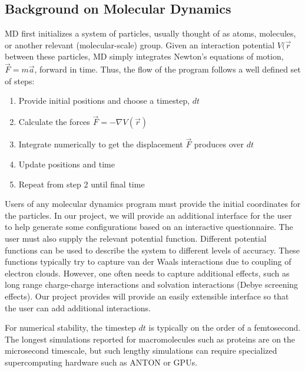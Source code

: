 \documentclass[10pt]{article}
\begin{document}
\subsection{Background on Molecular Dynamics}
MD first initializes a system of particles, usually thought of as atoms, molecules, or another relevant (molecular-scale) group.  Given an interaction potential $V (\overrightarrow{r}$ between these particles, MD simply integrates Newton's equations of motion, $\overrightarrow{F}=m\overrightarrow{a}$, forward in time.  Thus, the flow of the program follows a well defined set of steps:
\begin{enumerate}
    \item Provide initial positions and choose a timestep, $dt$
    \item Calculate the forces $\overrightarrow{F} =  -\nabla V (\overrightarrow{r}) $
    \item Integrate numerically to get the displacement $\overrightarrow{F}$ produces over $dt$
    \item Update positions and time
    \item Repeat from step 2 until final time
\end{enumerate}

Users of any molecular dynamics program must provide the initial coordinates for the particles.  In our project, we will provide an additional interface for the user to help generate some configurations based on an interactive questionnaire. The user must also supply the relevant potential function. Different potential functions can be used to describe the system to different levels of accuracy. These functions typically try to capture van der Waals interactions due to coupling of electron clouds. However, one  often needs to capture additional effects, such as long range charge-charge interactions and solvation interactions (Debye screening effects). Our project provides will provide an easily extensible interface so that the user can add additional interactions.

For numerical stability, the timestep $dt$ is typically on the order of a femtosecond. The longest simulations reported for macromolecules such as proteins are on the microsecond timescale, but such lengthy simulations can require specialized supercomputing hardware such as ANTON or GPUs.

\end{document}
